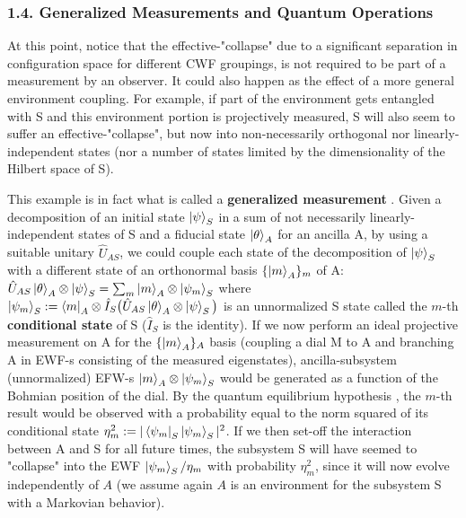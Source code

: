 \documentclass[11pt, a4paper]{article} %
\begin{document}
\subsubsection*{1.4. Generalized Measurements and Quantum Operations}\vspace{-0.1cm}
At this point, notice that the effective-"collapse" due to a significant separation in configuration space for different CWF groupings, is not required to be part of a measurement by an observer. It could also happen as the effect of a more general environment coupling. 
For example, if part of the environment gets entangled with S and this environment portion is projectively measured, S will also seem to suffer an effective-"collapse", but now into non-necessarily orthogonal nor linearly-independent states (nor a number of states limited by the dimensionality of the Hilbert space of S). 

This example is in fact what is called a {\bf generalized measurement} \cite{Generalized, Durr}. Given a decomposition of an initial state $\ket{\psi}_S$ in a sum of not necessarily linearly-independent states of S and a fiducial state $\ket{\theta}_A$ for an ancilla A, by using a suitable unitary $\hat{U}_{AS}$, we could couple each state of the decomposition of $\ket{\psi}_S$ with a different state of an orthonormal basis $\{\ket{m}_A\}_m$ of A: $\hat{U}_{AS}\ket{\theta}_A\otimes\ket{\psi}_S=\sum_m \ket{m}_A\otimes \ket{\psi_m}_S$ where $\ket{\psi_m}_S:=\bra{m}_A\otimes\hat{I}_S \big(\hat{U}_{AS}\ket{\theta}_A\otimes\ket{\psi}_S\big)$ is an unnormalized S state called the $m$-th {\bf conditional state} of S ($\hat{I}_S$ is the identity). If we now perform an ideal projective measurement on A for the $\{\ket{m}_A\}_A$ basis (coupling a dial M to A and branching A in EWF-s consisting of the measured eigenstates), ancilla-subsystem (unnormalized) EFW-s $\ket{m}_A\otimes \ket{\psi_m}_S$ would be generated as a function of the Bohmian position of the dial. By the quantum equilibrium hypothesis \cite{Absolute}, the $m$-th result would be observed with a probability equal to the norm squared of its conditional state $\eta_m^2:=|\bra{\psi_m}_S\ket{\psi_m}_S|^2$. If we then set-off the interaction between A and S for all future times, the subsystem S will have seemed to "collapse" into the EWF $\ket{\psi_m}_S/\eta_m$ with probability $\eta_m^2$, since it will now evolve independently of $A$ (we assume again $A$ is an environment for the subsystem S with a Markovian behavior).
\end{document}
